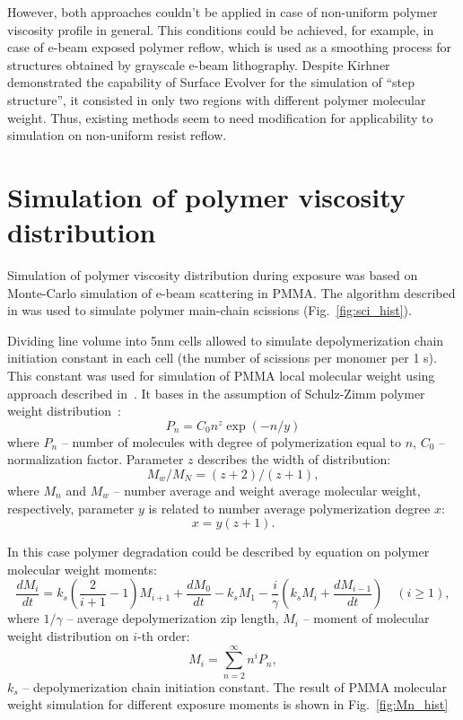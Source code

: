 \documentclass[12pt]{iopart}
\begin{document}
However, both approaches couldn't be applied in case of non-uniform polymer viscosity profile in general. This conditions could be achieved, for example, in case of e-beam exposed polymer reflow, which is used as a smoothing process for structures obtained by grayscale e-beam lithography. Despite Kirhner demonstrated the capability of Surface Evolver for the simulation of ``step structure'', it consisted in only two regions with different polymer molecular weight. Thus, existing methods seem to need modification for applicability to simulation on non-uniform resist reflow.


\section{Simulation of polymer viscosity distribution}
Simulation of polymer viscosity distribution during exposure was based on Monte-Carlo simulation of e-beam scattering in PMMA. The algorithm described in \cite{my_MEE} was used to simulate polymer main-chain scissions (Fig.~\ref{fig:sci_hist}).


Dividing line volume into 5nm cells allowed to simulate depolymerization chain initiation constant in each cell (the number of scissions per monomer per 1 s). This constant was used for simulation of PMMA local molecular weight using approach described in~\cite{Boyd_1, Boyd_2, Boyd_3}. It bases in the assumption of Schulz-Zimm polymer weight distribution~\cite{Schulz-Zimm_distribution}:
\begin{equation} \label{eq:Schulz-Zimm_distribution}
	P_n = C_0 n^z \exp (-n/y)
\end{equation}
where $P_n$ -- number of molecules with degree of polymerization equal to $n$, $C_0$ -- normalization factor. Parameter $z$ describes the width of distribution:
\begin{equation} \label{eq:Schulz-Zimm_1}
	M_w / M_N=(z+2) /(z+1),
\end{equation}
where $M_n$ and $M_w$ -- number average and weight average molecular weight, respectively, parameter $y$ is related to number average polymerization degree $x$:
\begin{equation} \label{eq:Schulz-Zimm_2}
	x=y(z+1).
\end{equation}

\noindent In this case polymer degradation could be described by equation on polymer molecular weight moments:
\begin{equation} \label{eq:moment_equation}
	\frac{d M_i}{d t}=k_s(\frac{2}{i+1}-1) M_{i+1}+\frac{d M_0}{d t}-k_s M_1 - \frac{i}{\gamma}(k_s M_i+\frac{d M_{i-1}}{d t}) \quad(i \geq 1),
\end{equation}
where $1/\gamma$ -- average depolymerization zip length, $M_i$ -- moment of molecular weight distribution on $i$-th order:
\begin{equation}
	M_i=\sum_{n=2}^{\infty} n^i P_n,
\end{equation}
$k_s$ -- depolymerization chain initiation constant. The result of PMMA molecular weight simulation for different exposure moments is shown in Fig.~\ref{fig:Mn_hist}
\end{document}
